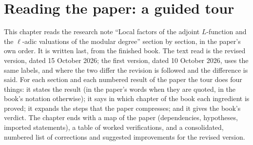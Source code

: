 \chapter{Reading the paper: a guided tour}\label{ch:paper}

This chapter reads the research note ``Local factors of the adjoint $L$-function and the $\ell$-adic valuations of the modular degree'' section by
section, in the paper's own order. It is written last, from the finished book. The text read is the revised version, dated 15 October 2026; the
first version, dated 10 October 2026, uses the same labels, and where the two differ the revision is followed and the difference is said. For each
section and each numbered result of the paper the tour does four things: it states the result (in the paper's words when they are quoted, in the
book's notation otherwise); it says in which chapter of the book each ingredient is proved; it expands the steps that the paper compresses; and it
gives the book's verdict. The chapter ends with a map of the paper (dependencies, hypotheses, imported statements), a table of worked
verifications, and a consolidated, numbered list of corrections and suggested improvements for the revised version.

